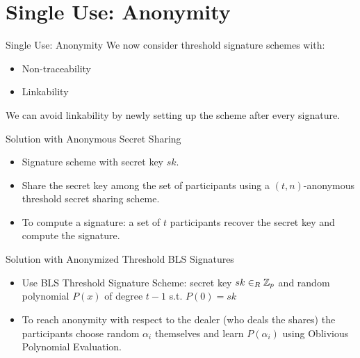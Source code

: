 \section{Single Use: Anonymity}
\begin{frame}{Single Use: Anonymity}
We now consider threshold signature schemes with:
\begin{itemize}
\item Non-traceability
\item Linkability
\end{itemize}

We can avoid linkability by newly setting up the scheme after every signature.

\end{frame}

\begin{frame}{Solution with Anonymous Secret Sharing}
\begin{itemize}
\item Signature scheme with secret key $sk$.
\item Share the secret key among the set of participants using a $(t,n)$-anonymous threshold secret sharing scheme.
\item To compute a signature: a set of $t$ participants recover the secret key and compute the signature.
\end{itemize}
\end{frame}

\begin{frame}{Solution with Anonymized Threshold BLS Signatures}
\begin{itemize}
\item Use BLS Threshold Signature Scheme: secret key $sk \in_R {\mathbb Z}_p$ and random polynomial $P(x)$ of degree $t-1$ s.t. $P(0) = sk$
\item To reach anonymity with respect to the dealer (who deals the shares) the participants choose random $\alpha_i$ themselves and learn $P(\alpha_i)$ using Oblivious Polynomial Evaluation.
\end{itemize}

\end{frame}